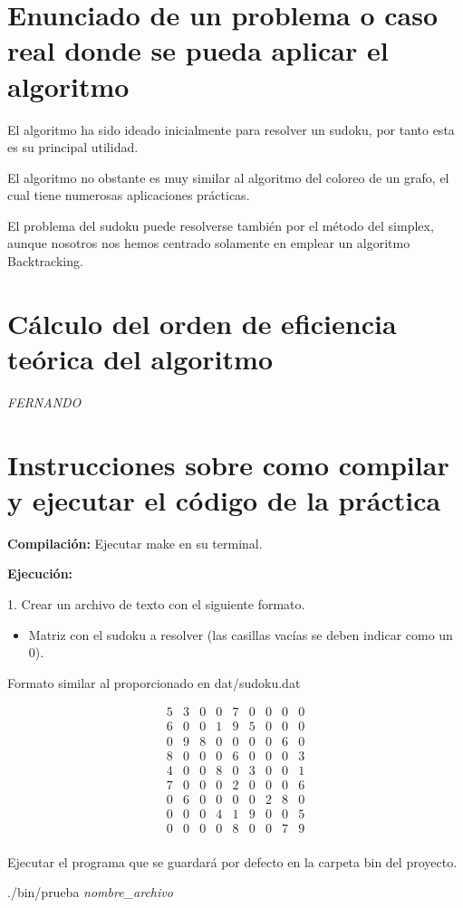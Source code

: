 \documentclass[11pt, a4paper]{article}
\theoremstyle{theorem-style}
\theoremstyle{definition-style}
\theoremstyle{remark-style}
\theoremstyle{example-style}
\begin{document}
\section{Enunciado de un problema o caso real donde se pueda aplicar el algoritmo}

El algoritmo ha sido ideado inicialmente para resolver un sudoku, por tanto esta es su principal utilidad. 

El algoritmo no obstante es muy similar al algoritmo del coloreo de un grafo, el cual tiene numerosas aplicaciones prácticas.

El problema del sudoku puede resolverse también por el método del simplex, aunque nosotros nos hemos centrado solamente en emplear un algoritmo Backtracking.

\section{Cálculo del orden de eficiencia teórica del algoritmo }

\textit{FERNANDO}

\section{Instrucciones sobre como compilar y ejecutar el código de la práctica}


\textbf{Compilación:} Ejecutar make en su terminal.

\textbf{Ejecución:} 

1. Crear un archivo de texto con el siguiente formato.
\begin{itemize}
\item Matriz con el sudoku a resolver (las casillas vacías se deben indicar como un 0).
\end{itemize}

Formato similar al proporcionado en dat/sudoku.dat

\[
\begin{array}{ccccccccc}
5 & 3 & 0 & 0 & 7 & 0 & 0 & 0 & 0\\
6 & 0 & 0 & 1 & 9 & 5 & 0 & 0 & 0\\
0 & 9 & 8 & 0 & 0 & 0 & 0 & 6 & 0\\
8 & 0 & 0 & 0 & 6 & 0 & 0 & 0 & 3\\
4 & 0 & 0 & 8 & 0 & 3 & 0 & 0 & 1\\
7 & 0 & 0 & 0 & 2 & 0 & 0 & 0 & 6\\
0 & 6 & 0 & 0 & 0 & 0 & 2 & 8 & 0\\
0 & 0 & 0 & 4 & 1 & 9 & 0 & 0 & 5\\
0 & 0 & 0 & 0 & 8 & 0 & 0 & 7 & 9\\
\end{array}
\]

Ejecutar el programa que se guardará por defecto en la carpeta bin del proyecto. 

./bin/prueba \textit{nombre\_archivo}
	
\end{document}
